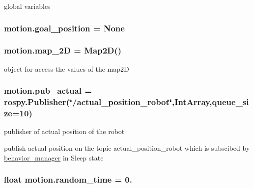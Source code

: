 global variables 
\subsubsection[{\texorpdfstring{goal\+\_\+position}{goal_position}}]{\setlength{\rightskip}{0pt plus 5cm}motion.\+goal\+\_\+position = None}\hypertarget{namespacemotion_a6886ce6765cc301867580755b977136a}{}\label{namespacemotion_a6886ce6765cc301867580755b977136a}
\subsubsection[{\texorpdfstring{map\+\_\+2D}{map_2D}}]{\setlength{\rightskip}{0pt plus 5cm}motion.\+map\+\_\+2D = {\bf Map2D}()}\hypertarget{namespacemotion_a858c2a633daaa0a83b599397041f524b}{}\label{namespacemotion_a858c2a633daaa0a83b599397041f524b}


object for access the values of the map2D 

\subsubsection[{\texorpdfstring{pub\+\_\+actual}{pub_actual}}]{\setlength{\rightskip}{0pt plus 5cm}motion.\+pub\+\_\+actual = rospy.\+Publisher(\char`\"{}/actual\+\_\+position\+\_\+robot\char`\"{},Int\+Array,queue\+\_\+size=10)}\hypertarget{namespacemotion_a9213de80f34f408518c9265ee283b588}{}\label{namespacemotion_a9213de80f34f408518c9265ee283b588}


publisher of actual position of the robot 

publish actual position on the topic actual\+\_\+position\+\_\+robot which is subscibed by \hyperlink{namespacebehavior__manager}{behavior\+\_\+manager} in Sleep state 
\subsubsection[{\texorpdfstring{random\+\_\+time}{random_time}}]{\setlength{\rightskip}{0pt plus 5cm}float motion.\+random\+\_\+time = 0.}\hypertarget{namespacemotion_a577a5f71c1bdf849f48eed17c4134bee}{}\label{namespacemotion_a577a5f71c1bdf849f48eed17c4134bee}
